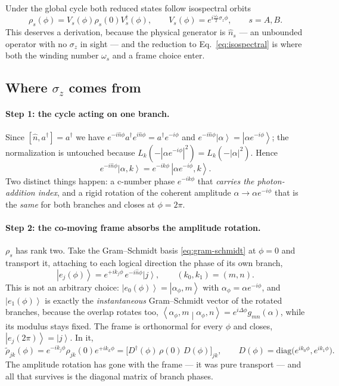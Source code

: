 \documentclass[11pt]{article}
\newcommand{\ket}[1]{\left|#1\right\rangle}
\newcommand{\braket}[2]{\left\langle#1\middle|#2\right\rangle}
\newcommand{\nop}{\hat n}
\begin{document}
Under the global cycle both reduced states follow isospectral orbits
\begin{equation}
\rho_s(\phi)=V_s(\phi)\rho_s(0)V_s^\dagger(\phi),\qquad
V_s(\phi)=e^{i\frac{\omega_s}{2}\sigma_z\phi},\qquad s=A,B .
\label{eq:isospectral}
\end{equation}
This deserves a derivation, because the physical generator is $\nop_s$ --- an
unbounded operator with no $\sigma_z$ in sight --- and the reduction to
Eq.~\eqref{eq:isospectral} is where both the winding number $\omega_s$ and a
frame choice enter.

\subsection{Where $\sigma_z$ comes from}
\label{sec:frame}

\paragraph{Step 1: the cycle acting on one branch.}
Since $[\nop,a^\dagger]=a^\dagger$ we have
$e^{-i\nop\phi}a^{\dagger}e^{i\nop\phi}=a^\dagger e^{-i\phi}$ and
$e^{-i\nop\phi}\ket{\alpha}=\ket{\alpha e^{-i\phi}}$; the normalization is
untouched because $L_k(-|\alpha e^{-i\phi}|^2)=L_k(-|\alpha|^2)$. Hence
\begin{equation}
e^{-i\nop\phi}\ket{\alpha,k}=e^{-ik\phi}\,\ket{\alpha e^{-i\phi},k} .
\label{eq:branch-evolution}
\end{equation}
Two distinct things happen: a c-number phase $e^{-ik\phi}$ that \emph{carries
the photon-addition index}, and a rigid rotation of the coherent amplitude
$\alpha\to\alpha e^{-i\phi}$ that is the \emph{same} for both branches and
closes at $\phi=2\pi$.

\paragraph{Step 2: the co-moving frame absorbs the amplitude rotation.}
$\rho_s$ has rank two. Take the Gram--Schmidt basis \eqref{eq:gram-schmidt} at
$\phi=0$ and transport it, attaching to each logical direction the phase of its
own branch,
\begin{equation}
\ket{e_j(\phi)}=e^{+ik_j\phi}\,e^{-i\nop\phi}\ket{j},\qquad (k_0,k_1)=(m,n) .
\label{eq:comoving}
\end{equation}
This is not an arbitrary choice: $\ket{e_0(\phi)}=\ket{\alpha_\phi,m}$ with
$\alpha_\phi=\alpha e^{-i\phi}$, and $\ket{e_1(\phi)}$ is exactly the
\emph{instantaneous} Gram--Schmidt vector of the rotated branches, because the
overlap rotates too,
$\braket{\alpha_\phi,m}{\alpha_\phi,n}=e^{i\Delta\phi}g_{mn}(\alpha)$, while
its modulus stays fixed. The frame is orthonormal for every $\phi$ and closes,
$\ket{e_j(2\pi)}=\ket{j}$. In it,
\begin{equation}
\tilde\rho_{jk}(\phi)=e^{-ik_j\phi}\rho_{jk}(0)e^{+ik_k\phi}
=\big[D^\dagger(\phi)\,\rho(0)\,D(\phi)\big]_{jk},\qquad
D(\phi)=\mathrm{diag}\big(e^{ik_0\phi},e^{ik_1\phi}\big).
\label{eq:D}
\end{equation}
The amplitude rotation has gone with the frame --- it was pure transport ---
and all that survives is the diagonal matrix of branch phases.
\end{document}
